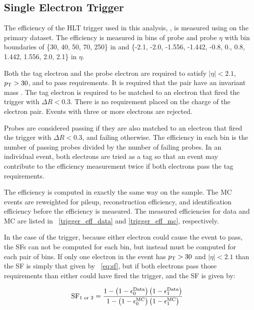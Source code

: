 \subsection{Single Electron Trigger}
\label{ssec:sf_trigger}

The efficiency of the HLT trigger used in this analysis,
\SingleElectronTrigger, is measured using \TnP on the primary dataset. The
efficiency is measured in bins of probe \pt and probe $\eta$ with bin
boundaries of \{30, 40, 50, 70, 250\} in \pt and \{-2.1, -2.0, -1.556, -1.442,
-0.8, 0., 0.8, 1.442, 1.556, 2.0, 2.1\} in $\eta$.

Both the tag electron and the probe electron are required to satisfy $|\eta| <
2.1$, $p_{\mathrm{T}} > 30$, and to pass \EGTIGHT requirements. It is required that the
pair have an invariant mass \MassRange. The tag electron is required to
be matched to an electron that fired the trigger with $\Delta R < 0.3$. There
is no requirement placed on the charge of the electron pair. Events with three
or more electrons are rejected.

Probes are considered passing if they are also matched to an electron that
fired the trigger with $\Delta R < 0.3$, and failing otherwise. The efficiency
in each bin is the number of passing probes divided by the number of failing
probes. In an individual event, both electrons are tried as a tag so that an
event may contribute to the efficiency measurement twice if both electrons pass
the tag requirements.

The efficiency is computed in exactly the same way on the \MADGRAPH sample. The
MC events are reweighted for pileup, reconstruction efficiency, and
identification efficiency before the efficiency is measured. The measured
efficiencies for data and MC are listed in \TABS~\ref{trigger_eff_data} and
\ref{trigger_eff_mc}, respectively.

In the case of the trigger, because either electron could cause the event to
pass, the SFs can not be computed for each bin, but instead must be computed
for each pair of bins. If only one electron in the event has $p_{\mathrm{T}} > 30$ and
$|\eta| < 2.1$ than the SF is simply that given by \EQ~\ref{eq:sf}, but if both
electrons pass those requirements than either could have fired the trigger, and
the SF is given by:

\begin{equation} \label{eq:sf_double}
    \text{SF}_{1 \text{ or } 2}
    =
    \frac{
        1 - \left( 1 - \epsilon^{\text{Data}}_{0} \right) \left( 1 - \epsilon^{\text{Data}}_{1} \right)
    } {
        1 - \left( 1 - \epsilon^{\text{MC}}_{0} \right) \left( 1 - \epsilon^{\text{MC}}_{1} \right)
    }
\end{equation}


